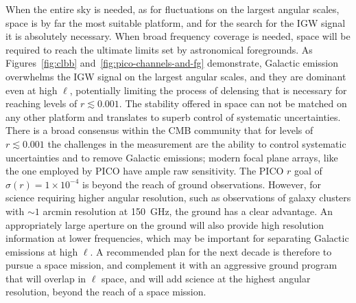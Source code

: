 \documentclass[PICOReport.tex]{subfiles}
\begin{document}
When the entire sky is needed, as for fluctuations on the largest angular scales, space is by far the most suitable platform, and for the search for the \ac{IGW} signal it is absolutely necessary. When broad frequency coverage is needed, space will be required to reach the ultimate limits set by astronomical foregrounds.  As Figures~\ref{fig:clbb} and~\ref{fig:pico-channels-and-fg} demonstrate, Galactic emission overwhelms the \ac{IGW} signal on the largest angular scales, and they are dominant even at high $\ell$, potentially limiting the process of delensing that is necessary for reaching levels of $r\lesssim0.001$. The stability offered in space can not be matched on any other platform and translates to superb control of systematic uncertainties. There is a broad consensus within the CMB community that for levels of $r \lesssim 0.001$ the challenges in the measurement are the ability to control systematic uncertainties and to remove Galactic emissions; modern focal plane arrays, like the one employed by PICO have ample raw sensitivity. The PICO $r$ goal of $\sigma(r)=1\times10^{-4}$ is beyond the reach of ground observations.  However, for science requiring higher angular resolution, such as observations of galaxy clusters with $\sim1$ arcmin resolution at 150~GHz, the ground has a clear advantage. An appropriately large aperture on the ground will also provide high resolution information at lower frequencies, which may be important for separating Galactic emissions at high $\ell$. 
A recommended plan for the next decade is therefore to pursue a space mission, and complement it with an aggressive ground program that will overlap in $\ell$ space, and will add science at the highest angular resolution, beyond the reach of a space mission. 

\end{document}
